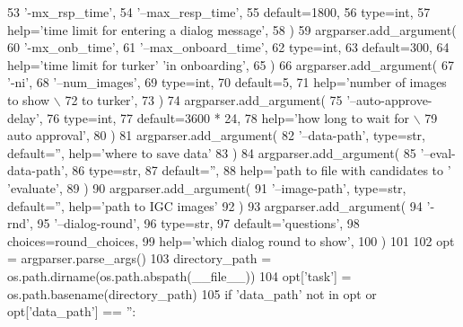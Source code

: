 \begin{DoxyCode}
53         \textcolor{stringliteral}{'-mx\_rsp\_time'},
54         \textcolor{stringliteral}{'--max\_resp\_time'},
55         default=1800,
56         type=int,
57         help=\textcolor{stringliteral}{'time limit for entering a dialog message'},
58     )
59     argparser.add\_argument(
60         \textcolor{stringliteral}{'-mx\_onb\_time'},
61         \textcolor{stringliteral}{'--max\_onboard\_time'},
62         type=int,
63         default=300,
64         help=\textcolor{stringliteral}{'time limit for turker'} \textcolor{stringliteral}{'in onboarding'},
65     )
66     argparser.add\_argument(
67         \textcolor{stringliteral}{'-ni'},
68         \textcolor{stringliteral}{'--num\_images'},
69         type=int,
70         default=5,
71         help=\textcolor{stringliteral}{'number of images to show \(\backslash\)}
72 \textcolor{stringliteral}{                           to turker'},
73     )
74     argparser.add\_argument(
75         \textcolor{stringliteral}{'--auto-approve-delay'},
76         type=int,
77         default=3600 * 24,
78         help=\textcolor{stringliteral}{'how long to wait for  \(\backslash\)}
79 \textcolor{stringliteral}{                           auto approval'},
80     )
81     argparser.add\_argument(
82         \textcolor{stringliteral}{'--data-path'}, type=str, default=\textcolor{stringliteral}{''}, help=\textcolor{stringliteral}{'where to save data'}
83     )
84     argparser.add\_argument(
85         \textcolor{stringliteral}{'--eval-data-path'},
86         type=str,
87         default=\textcolor{stringliteral}{''},
88         help=\textcolor{stringliteral}{'path to file with candidates to '} \textcolor{stringliteral}{'evaluate'},
89     )
90     argparser.add\_argument(
91         \textcolor{stringliteral}{'--image-path'}, type=str, default=\textcolor{stringliteral}{''}, help=\textcolor{stringliteral}{'path to IGC images'}
92     )
93     argparser.add\_argument(
94         \textcolor{stringliteral}{'-rnd'},
95         \textcolor{stringliteral}{'--dialog-round'},
96         type=str,
97         default=\textcolor{stringliteral}{'questions'},
98         choices=round\_choices,
99         help=\textcolor{stringliteral}{'which dialog round to show'},
100     )
101 
102     opt = argparser.parse\_args()
103     directory\_path = os.path.dirname(os.path.abspath(\_\_file\_\_))
104     opt[\textcolor{stringliteral}{'task'}] = os.path.basename(directory\_path)
105     \textcolor{keywordflow}{if} \textcolor{stringliteral}{'data\_path'} \textcolor{keywordflow}{not} \textcolor{keywordflow}{in} opt \textcolor{keywordflow}{or} opt[\textcolor{stringliteral}{'data\_path'}] == \textcolor{stringliteral}{''}:

\end{DoxyCode}
